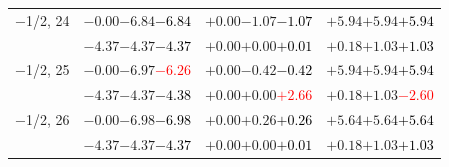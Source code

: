\documentclass[compress]{beamer}
\begin{document}
\begin{frame}
\begin{tabular}{r | c | c | c}
$-$1/2, 24 & $-0.00$\hspace{0.1 cm}$-6.84$\hspace{0.1 cm}\textcolor{black}{$-6.84$} & $+0.00$\hspace{0.1 cm}$-1.07$\hspace{0.1 cm}\textcolor{black}{$-1.07$} & $+5.94$\hspace{0.1 cm}$+5.94$\hspace{0.1 cm}\textcolor{black}{$+5.94$} \\
           & $-4.37$\hspace{0.1 cm}$-4.37$\hspace{0.1 cm}\textcolor{black}{$-4.37$} & $+0.00$\hspace{0.1 cm}$+0.00$\hspace{0.1 cm}\textcolor{black}{$+0.01$} & $+0.18$\hspace{0.1 cm}$+1.03$\hspace{0.1 cm}\textcolor{black}{$+1.03$} \\
$-$1/2, 25 & $-0.00$\hspace{0.1 cm}$-6.97$\hspace{0.1 cm}\textcolor{red}{$-6.26$} & $+0.00$\hspace{0.1 cm}$-0.42$\hspace{0.1 cm}\textcolor{black}{$-0.42$} & $+5.94$\hspace{0.1 cm}$+5.94$\hspace{0.1 cm}\textcolor{black}{$+5.94$} \\
           & $-4.37$\hspace{0.1 cm}$-4.37$\hspace{0.1 cm}\textcolor{black}{$-4.38$} & $+0.00$\hspace{0.1 cm}$+0.00$\hspace{0.1 cm}\textcolor{red}{$+2.66$} & $+0.18$\hspace{0.1 cm}$+1.03$\hspace{0.1 cm}\textcolor{red}{$-2.60$} \\
$-$1/2, 26 & $-0.00$\hspace{0.1 cm}$-6.98$\hspace{0.1 cm}\textcolor{black}{$-6.98$} & $+0.00$\hspace{0.1 cm}$+0.26$\hspace{0.1 cm}\textcolor{black}{$+0.26$} & $+5.64$\hspace{0.1 cm}$+5.64$\hspace{0.1 cm}\textcolor{black}{$+5.64$} \\
           & $-4.37$\hspace{0.1 cm}$-4.37$\hspace{0.1 cm}\textcolor{black}{$-4.37$} & $+0.00$\hspace{0.1 cm}$+0.00$\hspace{0.1 cm}\textcolor{black}{$+0.01$} & $+0.18$\hspace{0.1 cm}$+1.03$\hspace{0.1 cm}\textcolor{black}{$+1.03$} \\

\end{tabular}
\end{frame}
\end{document}
